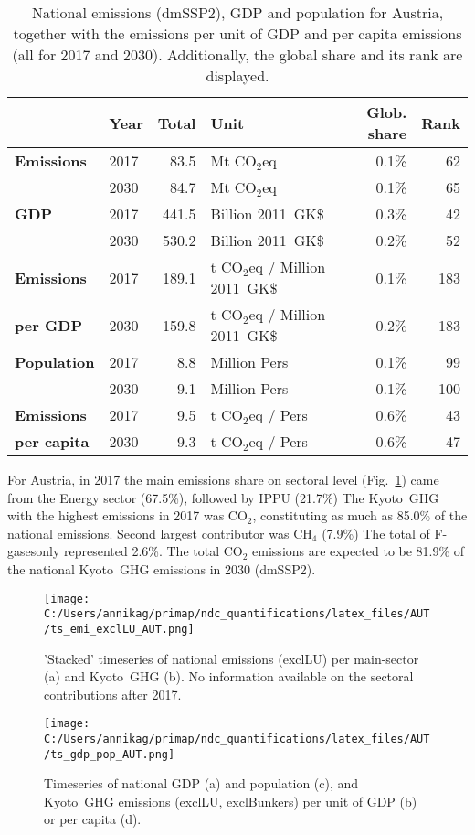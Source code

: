 \documentclass[12pt]{article}
\begin{document}
 \begin{table}[H]
 \centering
 \caption{National emissions (dmSSP2), GDP and population for Austria, together with the emissions per unit of GDP and per capita emissions (all for 2017 and 2030). 
 Additionally, the global share and its rank are displayed.}
 \label{tab:overview}
 \begin{tabular}{l || l r l r r}
 \bfseries  & \bfseries Year & \bfseries Total & \bfseries Unit & \bfseries Glob. share & \bfseries Rank \tabularnewline \hline \hline
 \bfseries Emissions & 2017 & 83.5 & Mt CO$_2$eq & 0.1\% & 62 \tabularnewline 
 \bfseries  & 2030 & 84.7 & Mt CO$_2$eq & 0.1\% & 65 \tabularnewline \hline
 \bfseries GDP & 2017 & 441.5 & Billion 2011~GK\$ & 0.3\% & 42 \tabularnewline 
 \bfseries  & 2030 & 530.2 & Billion 2011~GK\$ & 0.2\% & 52 \tabularnewline \hline
 \bfseries Emissions & 2017 & 189.1 & t CO$_2$eq / Million 2011~GK\$ & 0.1\% & 183 \tabularnewline 
 \bfseries per GDP & 2030 & 159.8 & t CO$_2$eq / Million 2011~GK\$ & 0.2\% & 183 \tabularnewline \hline
 \bfseries Population & 2017 & 8.8 & Million Pers & 0.1\% & 99 \tabularnewline 
 \bfseries  & 2030 & 9.1 & Million Pers & 0.1\% & 100 \tabularnewline \hline
 \bfseries Emissions & 2017 & 9.5 & t CO$_2$eq /  Pers & 0.6\% & 43 \tabularnewline 
 \bfseries per capita & 2030 & 9.3 & t CO$_2$eq /  Pers & 0.6\% & 47 \tabularnewline 
 \end{tabular}
 \end{table}

 For Austria, in 2017 the main emissions share on sectoral level (Fig.~\ref{fig:tsEmi}) came from the Energy sector (67.5\%), followed by IPPU (21.7\%)
 The Kyoto~GHG with the highest emissions in 2017 was CO$_2$, constituting as much as 85.0\% of the national emissions. 
 Second largest contributor was CH$_4$ (7.9\%)
 The total of F-gasesonly represented 2.6\%.
 The total CO$_2$ emissions are expected to be 81.9\% of the national Kyoto~GHG emissions in 2030 (dmSSP2).

 \begin{figure}[H]
 \centering
 \texttt{[image: C:/Users/annikag/primap/ndc\_quantifications/latex\_files/AUT/ts\_emi\_exclLU\_AUT.png]}
 \caption{'Stacked' timeseries of national emissions (exclLU) per main-sector (a) and Kyoto~GHG (b). 
 No information available on the sectoral contributions after 2017.}
 \label{fig:tsEmi}
 \end{figure}

 \begin{figure}[H]
 \centering
 \texttt{[image: C:/Users/annikag/primap/ndc\_quantifications/latex\_files/AUT/ts\_gdp\_pop\_AUT.png]}
 \caption{Timeseries of national GDP (a) and population (c), and Kyoto~GHG emissions (exclLU, exclBunkers) per unit of GDP (b) or per capita (d).}
 \label{fig:tsSocioEco}
 \end{figure}
\end{document}
